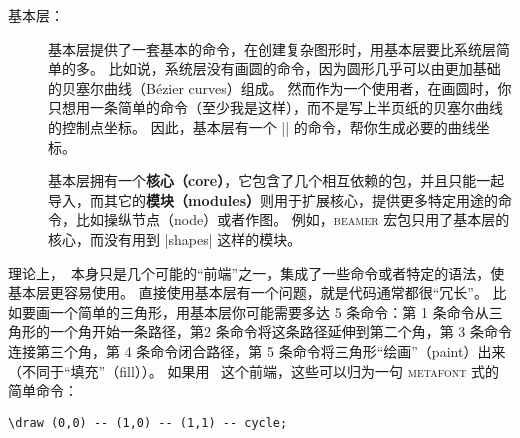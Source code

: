 \begin{onehalfspacing}
\begin{description}
\item[基本层：]
基本层提供了一套基本的命令，在创建复杂图形时，用基本层要比系统层简单的多。
比如说，系统层没有画圆的命令，因为圆形几乎可以由更加基础的贝塞尔曲线（B\'ezier curves）组成。
然而作为一个使用者，在画圆时，你只想用一条简单的命令（至少我是这样），而不是写上半页纸的贝塞尔曲线的控制点坐标。
因此，基本层有一个 |\pgfpathcircle| 的命令，帮你生成必要的曲线坐标。

基本层拥有一个\textbf{核心（core）}，它包含了几个相互依赖的包，并且只能一起导入，而其它的\textbf{模块（modules）}则用于扩展核心，提供更多特定用途的命令，比如操纵节点（node）或者作图。
例如，\textsc{beamer} 宏包只用了基本层的核心，而没有用到 |shapes| 这样的模块。
\end{description}

理论上，\tikzname\ 本身只是几个可能的“前端”之一，集成了一些命令或者特定的语法，使基本层更容易使用。
直接使用基本层有一个问题，就是代码通常都很“冗长”。
比如要画一个简单的三角形，用基本层你可能需要多达 5 条命令：第 1 条命令从三角形的一个角开始一条路径，第2 条命令将这条路径延伸到第二个角，第 3 条命令连接第三个角，第 4 条命令闭合路径，第 5 条命令将三角形“绘画”（paint）出来（不同于“填充”（fill））。
如果用 \tikzname\ 这个前端，这些可以归为一句 \textsc{metafont} 式的简单命令：
\begin{verbatim}
\draw (0,0) -- (1,0) -- (1,1) -- cycle;
\end{verbatim}


\end{onehalfspacing}
